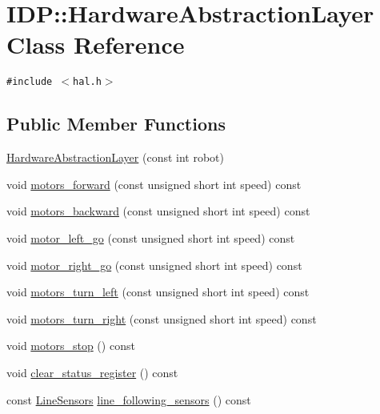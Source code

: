 \hypertarget{classIDP_1_1HardwareAbstractionLayer}{
\section{IDP::HardwareAbstractionLayer Class Reference}
\label{classIDP_1_1HardwareAbstractionLayer}
}
{\tt \#include $<$hal.h$>$}

\subsection*{Public Member Functions}
\begin{CompactItemize}
\item 
\hyperlink{classIDP_1_1HardwareAbstractionLayer_424d40bbaed459f571b46dbb45bb8576}{HardwareAbstractionLayer} (const int robot)
\item 
void \hyperlink{classIDP_1_1HardwareAbstractionLayer_0c5a7c42e881c0b4bf8b3f5497c1e4ca}{motors\_\-forward} (const unsigned short int speed) const 
\item 
void \hyperlink{classIDP_1_1HardwareAbstractionLayer_43a8ac2e89e101cd8976ce10401e6142}{motors\_\-backward} (const unsigned short int speed) const 
\item 
void \hyperlink{classIDP_1_1HardwareAbstractionLayer_2ff5baa231a7796845a7cf2fb041c0c0}{motor\_\-left\_\-go} (const unsigned short int speed) const 
\item 
void \hyperlink{classIDP_1_1HardwareAbstractionLayer_bdee21a9673a458f2a91d240369e08a1}{motor\_\-right\_\-go} (const unsigned short int speed) const 
\item 
void \hyperlink{classIDP_1_1HardwareAbstractionLayer_deb07393ffab83877500183162c0bed2}{motors\_\-turn\_\-left} (const unsigned short int speed) const 
\item 
void \hyperlink{classIDP_1_1HardwareAbstractionLayer_bf4317f045b498e7e67aff208fa8d519}{motors\_\-turn\_\-right} (const unsigned short int speed) const 
\item 
void \hyperlink{classIDP_1_1HardwareAbstractionLayer_186e188450a83ec4174670e1eb6c40bb}{motors\_\-stop} () const 
\item 
void \hyperlink{classIDP_1_1HardwareAbstractionLayer_1902d9260758777966ab362e21f3be42}{clear\_\-status\_\-register} () const 
\item 
const \hyperlink{structIDP_1_1LineSensors}{LineSensors} \hyperlink{classIDP_1_1HardwareAbstractionLayer_ca143d627de2ff9942069ad922d17ee5}{line\_\-following\_\-sensors} () const 
\end{CompactItemize}


